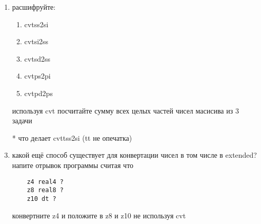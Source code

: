 \documentclass[a4paper,10pt]{article}
\begin{document}
\begin{enumerate}
    \item расшифруйте:
    \begin{enumerate}
        \item cvtss2si 
        \item cvtsi2ss
        \item cvtsd2ss
        \item cvtps2pi
        \item cvtpd2ps 
    \end{enumerate}
    используя cvt посчитайте сумму всех целых частей чисел масисива из 3 задачи\\
    \item[*] что делает cvttss2si (tt не опечатка)
    \item  какой ещё способ существует для конвертации чисел в том числе в extended? \\
    напите отрывок программы считая что \\
\begin{verbatim}
    z4 real4 ?
    z8 real8 ?
    z10 dt ?
\end{verbatim}
    конвертните z4 и положите в z8 и z10 не используя cvt
\end{enumerate}
\end{document}
